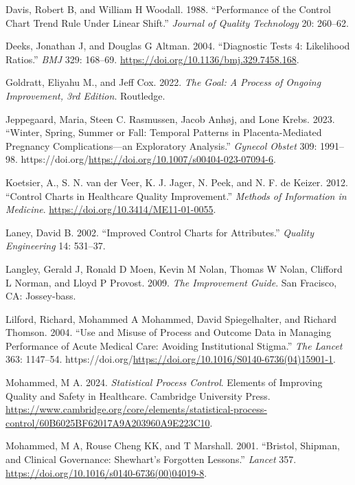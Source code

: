 \documentclass[
]{book}
\newlength{\cslhangindent}
\newenvironment{CSLReferences}[2] %
 {\begin{list}{}{%
  \setlength{\itemindent}{0pt}
  \setlength{\leftmargin}{0pt}
  \setlength{\parsep}{0pt}
  \ifodd #1
   \setlength{\leftmargin}{\cslhangindent}
   \setlength{\itemindent}{-1\cslhangindent}
  \fi
  \setlength{\itemsep}{#2\baselineskip}}}
 {\end{list}}
\begin{document}
\begin{CSLReferences}{1}{0}
Davis, Robert B, and William H Woodall. 1988. {``Performance of the Control Chart Trend Rule Under Linear Shift.''} \emph{Journal of Quality Technology} 20: 260--62.

Deeks, Jonathan J, and Douglas G Altman. 2004. {``Diagnostic Tests 4: Likelihood Ratios.''} \emph{BMJ} 329: 168--69. \url{https://doi.org/10.1136/bmj.329.7458.168}.

Goldratt, Eliyahu M., and Jeff Cox. 2022. \emph{The Goal: A Process of Ongoing Improvement, 3rd Edition}. Routledge.

Jeppegaard, Maria, Steen C. Rasmussen, Jacob Anhøj, and Lone Krebs. 2023. {``Winter, Spring, Summer or Fall: Temporal Patterns in Placenta-Mediated Pregnancy Complications---an Exploratory Analysis.''} \emph{Gynecol Obstet} 309: 1991--98. https://doi.org/\url{https://doi.org/10.1007/s00404-023-07094-6}.

Koetsier, A., S. N. van der Veer, K. J. Jager, N. Peek, and N. F. de Keizer. 2012. {``Control Charts in Healthcare Quality Improvement.''} \emph{Methods of Information in Medicine}. \url{https://doi.org/10.3414/ME11-01-0055}.

Laney, David B. 2002. {``Improved Control Charts for Attributes.''} \emph{Quality Engineering} 14: 531--37.

Langley, Gerald J, Ronald D Moen, Kevin M Nolan, Thomas W Nolan, Clifford L Norman, and Lloyd P Provost. 2009. \emph{The Improvement Guide}. San Fracisco, CA: Jossey-bass.

Lilford, Richard, Mohammed A Mohammed, David Spiegelhalter, and Richard Thomson. 2004. {``Use and Misuse of Process and Outcome Data in Managing Performance of Acute Medical Care: Avoiding Institutional Stigma.''} \emph{The Lancet} 363: 1147--54. https://doi.org/\url{https://doi.org/10.1016/S0140-6736(04)15901-1}.

Mohammed, M A. 2024. \emph{Statistical Process Control}. Elements of Improving Quality and Safety in Healthcare. Cambridge University Press. \url{https://www.cambridge.org/core/elements/statistical-process-control/60B6025BF62017A9A203960A9E223C10}.

Mohammed, M A, Rouse Cheng KK, and T Marshall. 2001. {``Bristol, Shipman, and Clinical Governance: Shewhart's Forgotten Lessons.''} \emph{Lancet} 357. \url{https://doi.org/10.1016/s0140-6736(00)04019-8}.


\end{CSLReferences}
\end{document}
